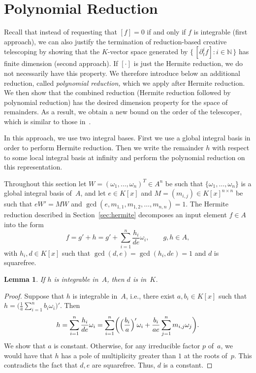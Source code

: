 \documentclass{sig-alternate}
\newtheorem{lemma}[theorem]{Lemma}
\let\set\mathbb
\begin{document}
\section{Polynomial Reduction}\label{sec:polynomial}

Recall that instead of requesting that $[f]=0$ if and only if $f$ is integrable
(first approach), we can also justify the termination of reduction-based
creative telescoping by showing that the $K$-vector space generated by $\{\,[\partial_t^if]:i\in\set N\,\}$
has finite dimension (second approach). If $[\cdot]$ is just the Hermite
reduction, we do not necessarily have this property. We therefore introduce below an
additional reduction, called \emph{polynomial reduction,} which we apply after
Hermite reduction. We then show that the combined reduction (Hermite reduction
followed by polynomial reduction) has the desired dimension property for the
space of remainders. As a result, we obtain a new bound on the order of the
telescoper, which is similar to those in~\cite{chen12d,chen14a}.

In this approach, we use two integral bases. First we use a global integral basis
in order to perform Hermite reduction. Then we write the
remainder $h$ with respect to some local integral basis at infinity and perform the
polynomial reduction on this representation.

Throughout this section let $W=(\omega_1,\ldots,\omega_n)^T\in A^n$ be such
that $\{\omega_1, \ldots, \omega_n\}$ is a global integral basis of~$A$, and
let $e\in K[x]$ and $M=(m_{i,j})\in K[x]^{n\times n}$ be such that $eW'=MW$
and $\gcd(e, m_{1, 1}, m_{1, 2}, \ldots, m_{n ,n})=1$. The Hermite reduction
described in Section~\ref{sec:hermite} decomposes an input element $f\in A$
into the form
\[
  f = g' + h = g' + \sum_{i=1}^n \frac{h_i}{de} \omega_i,\qquad
  g, h\in A,
\]
with $h_i, d\in K[x]$ such that $\gcd(d, e)=\gcd(h_i,de)=1$ and $d$ is squarefree.
\begin{lemma}\label{LEM:d}
If $h$ is integrable in~$A$, then $d$ is in~$K$.
\end{lemma}
\begin{proof}
Suppose that $h$ is integrable in~$A$, i.e., there exist $a, b_i\in K[x]$
such that $h = \bigl(\frac{1}{a}\sum_{i=1}^n b_i \omega_i\bigr)'$. Then
\[
  h = \sum_{i=1}^n \frac{h_i}{de}\omega_i= \sum_{i=1}^n \biggl(\Bigl(\frac{b_i}{a}\Bigr)' \omega_i +
  \frac{b_i}{a e} \sum_{j=1}^n  m_{i, j}\omega_j\biggr).
\]
We show that $a$ is constant. Otherwise, for any irreducible factor $p$ of~$a$, we would have that $h$ has a pole of
multiplicity greater than $1$ at the roots of~$p$. This contradicts
the fact that $d, e$ are squarefree. Thus, $d$ is a constant.
\end{proof}
\end{document}
